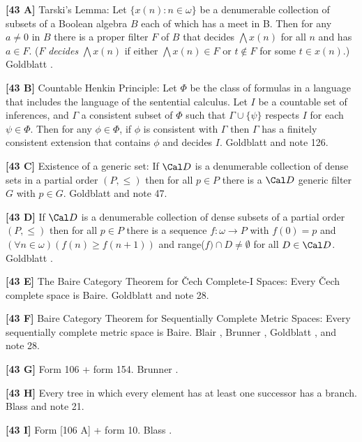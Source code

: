 \smallskip
\item{}{\bf [43 A]}  Tarski's Lemma:  Let $\{x(n): n\in\omega\}$ be a
denumerable collection of subsets of a Boolean algebra $B$ each of
which has a meet in B.  Then for any $a \neq 0$ in $B$ there is a
proper filter $F$ of $B$ that decides $\bigwedge x(n)$ for  all $n$  and
has $a\in F$. ($F$ {\it decides} $\bigwedge x(n)$ if either $\bigwedge
x(n)\in F$ or $t\not\in F$ for some $t\in x(n)$.) \ac{Goldblatt} \cite{1985}.
\smallskip
\item{}{\bf [43 B]}  Countable Henkin Principle: Let $\Phi$ be the
class of formulas in a language that includes the language of the
sentential calculus. Let $I$ be a countable set of inferences, and
$\Gamma$ a consistent subset of $\Phi$ such that $\Gamma\cup\{\psi\}$
respects $I$ for each $\psi\in\Phi$. Then for any $\phi\in\Phi$, if
$\phi$ is consistent with $\Gamma$ then $\Gamma$ has a finitely
consistent extension that contains $\phi$  and decides $I$. \ac{Goldblatt}
\cite{1985} and note 126. 
\smallskip
\item{}{\bf [43 C]} Existence of a generic set: If ${\Cal D}$ is a
denumerable collection of dense sets in a partial order $(P,\le)$ then
for all $p\in P$ there is a ${\Cal D}$ generic filter $G$ with $p\in G$.
\ac{Goldblatt} \cite{1985} and note 47.
\smallskip
\item{}{\bf [43 D]}  If ${\Cal D}$ is a denumerable collection of dense
subsets of a partial order $(P,\le)$ then for all $p\in P$ there is
a sequence $f: \omega\rightarrow P$ with $f(0) = p$ and $(\forall
n\in\omega)(f(n)\ge f(n+1))$ and range($f)\cap D\neq
\emptyset$  for all $D \in  {\Cal D}$.  \ac{Goldblatt} \cite{1985}.
\smallskip
\item{}{\bf [43 E]} The Baire Category Theorem for \v Cech Complete-I
Spaces:  Every \v Cech complete space is Baire.
\ac{Goldblatt} \cite{1985} and note 28.
\smallskip
\item{}{\bf [43 F]}  Baire Category Theorem for Sequentially Complete
Metric Spaces:  Every sequentially complete metric space is Baire.
\ac{Blair} \cite{1977}, \ac{Brunner} \cite{1983c}, \ac{Goldblatt}
\cite{1985}, and note 28.
\smallskip
\item{}{\bf [43 G]}  Form 106 + form 154. \ac{Brunner} \cite{1983c}
\cite{1984b}.
\smallskip
\item{}{\bf [43 H]} Every tree in which every element has at least
one successor has a branch.  \ac{Blass} \cite{1979} and note 21.
\smallskip
\item{}{\bf [43 I]}  Form [106 A] + form 10. \ac{Blass} \cite{1979}.
